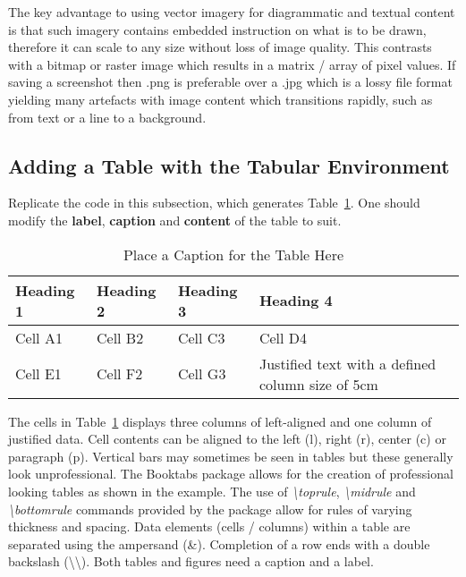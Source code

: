 The key advantage to using vector imagery for diagrammatic and textual content is that such imagery contains embedded instruction on what is to be drawn, therefore it can scale to any size without loss of image quality. This contrasts with a bitmap or raster image which results in a matrix / array of pixel values. If saving a screenshot then  .png is preferable over a .jpg which is a lossy file format yielding many artefacts with image content which transitions rapidly, such as from text or a line to a background.

\subsection{Adding a Table with the Tabular Environment}
Replicate the code in this subsection, which generates Table~\ref{tab:TableExample}. One should modify the \textbf{label}, \textbf{caption} and \textbf{content} of the table to suit. 
\begin{table}[H]
\caption{Place a Caption for the Table Here}\label{tab:TableExample}
\centering
\small
\begin{tabular}{lllp{5cm}}
\toprule \textbf{Heading 1}& \textbf{Heading 2}&\textbf{Heading 3}&\textbf{Heading 4}\\
\midrule
Cell A1 & Cell B2 & Cell C3 & Cell D4\\
Cell E1 & Cell F2 & Cell G3 & Justified text with a defined column size of 5cm\\
\bottomrule
\end{tabular}
\end{table}

The cells in Table~\ref{tab:TableExample} displays three columns of left-aligned and one column of justified data. Cell contents can be aligned to the left (l), right (r), center (c) or paragraph (p). Vertical bars may sometimes be seen in tables but these generally look unprofessional. The Booktabs package \cite{online:Fear2005BookTabs} allows for the creation of professional looking tables as shown in the example.  The use of \emph{\textbackslash toprule}, \emph{\textbackslash midrule} and \emph{\textbackslash bottomrule} commands provided by the package allow for rules of varying thickness and spacing. Data elements (cells / columns) within a table are separated using the ampersand (\&). Completion of a row ends with a double backslash (\textbackslash\textbackslash). Both tables and figures need a caption and a label.

